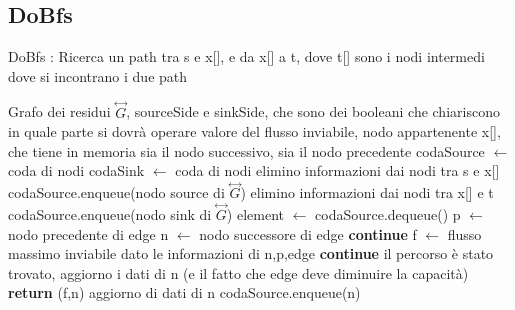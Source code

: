 \documentclass{article}
\begin{document}
\subsection{DoBfs}
\begin{algorithm}
\caption{DoBfs : Ricerca un path tra s e x[], e da x[] a t, dove t[] sono i nodi intermedi dove si incontrano i due path}
\begin{algorithmic}[1]
\REQUIRE Grafo dei residui $\overset{\leftrightarrow}{G}$, sourceSide e sinkSide, che sono dei booleani che chiariscono in quale parte si dovrà operare
\ENSURE valore del flusso inviabile, nodo appartenente x[], che tiene in memoria sia il nodo successivo, sia il nodo precedente
\STATE codaSource $\leftarrow$ coda di nodi
\STATE codaSink $\leftarrow$ coda di nodi
\STATE elimino informazioni dai nodi tra s e x[]
\STATE codaSource.enqueue(nodo source di $\overset{\leftrightarrow}{G}$)
\ENDIF
{}
\STATE elimino informazioni dai nodi tra x[] e t
\STATE codaSource.enqueue(nodo sink di $\overset{\leftrightarrow}{G}$)
\ENDIF
\STATE{}
\STATE element $\leftarrow$ codaSource.dequeue()
\STATE p $\leftarrow$ nodo precedente di edge
\STATE n $\leftarrow$ nodo successore di edge
\STATE \textbf{continue}
\ELSE
\STATE f $\leftarrow$ flusso massimo inviabile dato le informazioni di n,p,edge
\STATE \textbf{continue}
\ENDIF
\STATE il percorso è stato trovato, aggiorno i dati di n (e il fatto che edge deve diminuire la capacità)
\STATE \textbf{return} (f,n)
\ENDIF
\ENDIF
\STATE aggiorno di dati di n
\STATE codaSource.enqueue(n)
\ENDIF
{}
\end{algorithmic}
\end{algorithm}
\newpage
\end{document}
